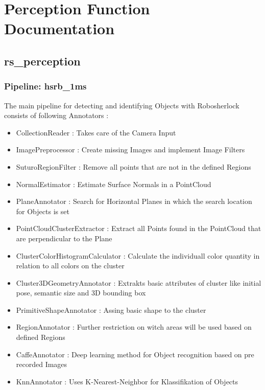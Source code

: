 \documentclass[main.tex]{subfiles}
\begin{document}
\begingroup

\renewcommand{\cleardoublepage}{}

\renewcommand{\clearpage}{}

\chapter{Perception Function Documentation}

		\section{rs\_perception}

			\subsection{Pipeline: hsrb\_1ms}

The main pipeline for detecting and identifying Objects with Robosherlock consists of following Annotators :  
\begin{itemize}
	\item CollectionReader : Takes care of the Camera  Input
	\item ImagePreprocessor : Create missing Images and implement Image Filters  
	\item SuturoRegionFilter : Remove all points that are not in the defined Regions 
	\item NormalEstimator : Estimate Surface Normals in a PointCloud 
	\item PlaneAnnotator : Search for Horizontal Planes in which the search location for Objects is set
	\item PointCloudClusterExtractor : Extract all Points found in the PointCloud that are perpendicular to the Plane 
	\item ClusterColorHistogramCalculator : Calculate the individuall color quantity in relation to all colors on the cluster   
	\item Cluster3DGeometryAnnotator : Extrakts basic attributes of cluster like initial pose, semantic size and 3D bounding box 
	\item PrimitiveShapeAnnotator : Assing basic shape to the cluster
	\item RegionAnnotator : Further restriction on witch areas will be used based on defined Regions 
	\item CaffeAnnotator : Deep learning method for Object recognition based on pre recorded Images 
	\item KnnAnnotator : Uses K-Nearest-Neighbor for Klassifikation of Objects 
\end{itemize}
\end{document}
